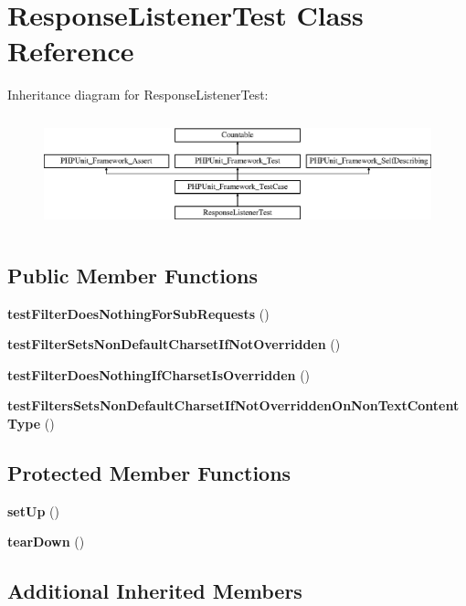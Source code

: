 \section{Response\+Listener\+Test Class Reference}
\label{class_symfony_1_1_component_1_1_http_kernel_1_1_tests_1_1_event_listener_1_1_response_listener_test}
Inheritance diagram for Response\+Listener\+Test\+:\begin{figure}[H]
\begin{center}
\leavevmode
\includegraphics[height=3.303835cm]{class_symfony_1_1_component_1_1_http_kernel_1_1_tests_1_1_event_listener_1_1_response_listener_test}
\end{center}
\end{figure}
\subsection*{Public Member Functions}
\begin{DoxyCompactItemize}
\item 
{\bf test\+Filter\+Does\+Nothing\+For\+Sub\+Requests} ()
\item 
{\bf test\+Filter\+Sets\+Non\+Default\+Charset\+If\+Not\+Overridden} ()
\item 
{\bf test\+Filter\+Does\+Nothing\+If\+Charset\+Is\+Overridden} ()
\item 
{\bf test\+Filters\+Sets\+Non\+Default\+Charset\+If\+Not\+Overridden\+On\+Non\+Text\+Content\+Type} ()
\end{DoxyCompactItemize}
\subsection*{Protected Member Functions}
\begin{DoxyCompactItemize}
\item 
{\bf set\+Up} ()
\item 
{\bf tear\+Down} ()
\end{DoxyCompactItemize}
\subsection*{Additional Inherited Members}


